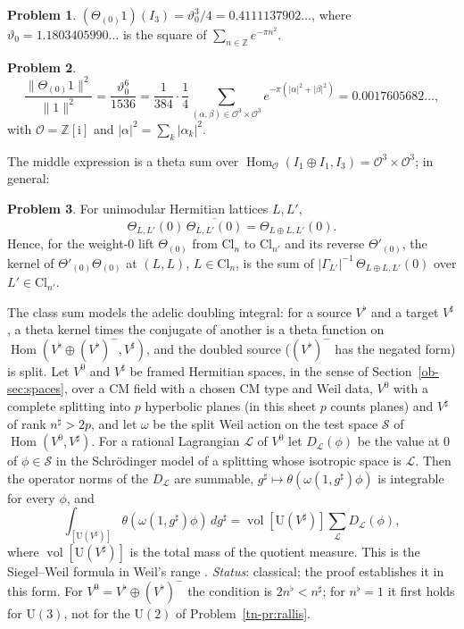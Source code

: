 \documentclass[reqno]{amsart}
\theoremstyle{definition}
\newtheorem{problem}{Problem}[section]
\theoremstyle{plain}
\newcommand{\Z}{\mathbb{Z}}
\newcommand{\ii}{\mathrm{i}}
\newcommand{\Oc}{\mathcal{O}}
\newcommand{\Cl}{\mathrm{Cl}}
\newcommand{\U}{\mathrm{U}}
\newcommand{\Hom}{\operatorname{Hom}}
\newcommand{\vol}{\operatorname{vol}}
\begin{document}
\begin{problem}\label{pr:theta-I3}
\((\Theta_{(0)} 1)(I_3) = \vartheta_0^3/4 = 0.4111137902\ldots\), where \(\vartheta_0 = 1.1803405990\ldots\) is the square of \(\sum_{n \in \Z} e^{-\pi n^2}\).
\end{problem}

\begin{problem}\label{pr:norm-I3}
\[
  \frac{\lVert \Theta_{(0)} 1 \rVert^2}{\lVert 1 \rVert^2} = \frac{\vartheta_0^6}{1536} = \frac{1}{384}\cdot\frac14 \sum_{(\alpha, \beta) \in \Oc^3 \times \Oc^3} e^{-\pi(\lvert \alpha\rvert^2 + \lvert \beta\rvert^2)} = 0.0017605682\ldots ,
\]
with \(\Oc = \Z[\ii]\) and \(\lvert \alpha\rvert^2 = \sum_k \lvert \alpha_k\rvert^2\).
\end{problem}

The middle expression is a theta sum over \(\Hom_\Oc(I_1 \oplus I_1, I_3) = \Oc^3 \times \Oc^3\); in general:

\begin{problem}\label{pr:double}
For unimodular Hermitian lattices \(L, L'\),
\[
  \Theta_{L,L'}(0)\, \overline{\Theta_{L,L'}(0)} = \Theta_{L \oplus L, L'}(0) .
\]
Hence, for the weight-\(0\) lift \(\Theta_{(0)}\) from \(\Cl_n\) to \(\Cl_{n'}\) and its reverse \(\Theta'_{(0)}\), the kernel of \(\Theta'_{(0)}\Theta_{(0)}\) at \((L, L)\), \(L \in \Cl_n\), is the sum of \(\lvert\Gamma_{L'}\rvert^{-1}\, \Theta_{L \oplus L, L'}(0)\) over \(L' \in \Cl_{n'}\).
\end{problem}

The class sum models the adelic doubling integral: for a source \(V^\flat\) and a target \(V^\sharp\), a theta kernel times the conjugate of another is a theta function on \(\Hom(V^\flat \oplus (V^\flat)^-, V^\sharp)\), and the doubled source (\((V^\flat)^-\) has the negated form) is split.  Let \(V^0\) and \(V^\sharp\) be framed Hermitian spaces, in the sense of Section~\ref{ob-sec:spaces}, over a CM field with a chosen CM type and Weil data, \(V^0\) with a complete splitting into \(p\) hyperbolic planes (in this sheet \(p\) counts planes) and \(V^\sharp\) of rank \(n^\sharp > 2p\), and let \(\omega\) be the split Weil action on the test space \(\mathcal S\) of \(\Hom(V^0, V^\sharp)\).  For a rational Lagrangian \(\mathcal L\) of \(V^0\) let \(D_{\mathcal L}(\phi)\) be the value at \(0\) of \(\phi \in \mathcal S\) in the Schr\"odinger model of a splitting whose isotropic space is \(\mathcal L\).  Then the operator norms of the \(D_{\mathcal L}\) are summable, \(g^\sharp \mapsto \theta(\omega(1, g^\sharp) \phi)\) is integrable for every \(\phi\), and
\[
  \int_{[\U(V^\sharp)]} \theta(\omega(1, g^\sharp) \phi)\, dg^\sharp = \vol[\U(V^\sharp)] \sum_{\mathcal L} D_{\mathcal L}(\phi) ,
\]
where \(\vol[\U(V^\sharp)]\) is the total mass of the quotient measure.  This is the Siegel--Weil formula in Weil's range \cite[Thm.~5]{We65}.  \emph{Status}: classical; the proof establishes it in this form.  For \(V^0 = V^\flat \oplus (V^\flat)^-\) the condition is \(2n^\flat < n^\sharp\); for \(n^\flat = 1\) it first holds for \(\U(3)\), not for the \(\U(2)\) of Problem~\ref{tn-pr:rallis}.
\end{document}
